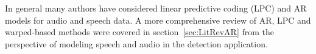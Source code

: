 In general many authors have considered linear predictive coding (LPC) and AR models for audio and speech data\cite{Vaseghi1990}\cite{Czyzewski1995}\cite{Godsill1998}. A more comprehensive review of AR, LPC and warped-based methods were covered in section~\ref{sec:LitRevAR} from the perspective of modeling speech and audio in the detection application.

%







